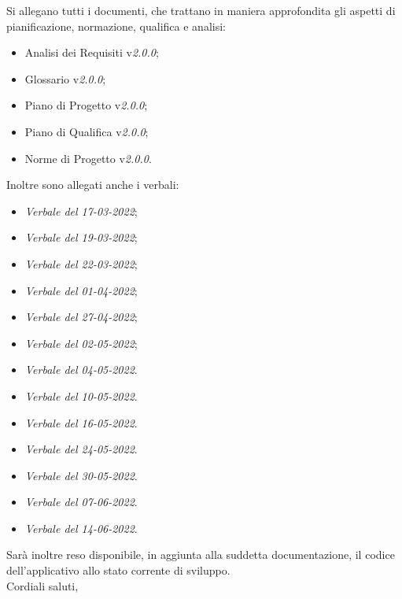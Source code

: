 \documentclass[a4paper, 12pt]{letter}
\begin{document}
\begin{letter}
        Si allegano tutti i documenti, che trattano in maniera approfondita gli aspetti di pianificazione, normazione, qualifica e analisi:
        \begin{itemize}
        	\item Analisi dei Requisiti v\textit{2.0.0};
            \item Glossario v\textit{2.0.0};
            \item Piano di Progetto v\textit{2.0.0};
            \item Piano di Qualifica v\textit{2.0.0};
            \item Norme di Progetto v\textit{2.0.0}.
        \end{itemize}
        Inoltre sono allegati anche i verbali:
        \begin{itemize}
            \item \textit{Verbale del 17-03-2022};
            \item \textit{Verbale del 19-03-2022};
            \item \textit{Verbale del 22-03-2022};
            \item \textit{Verbale del 01-04-2022};
            \item \textit{Verbale del 27-04-2022};
            \item \textit{Verbale del 02-05-2022};
            \item \textit{Verbale del 04-05-2022}.
            \item \textit{Verbale del 10-05-2022}.
            \item \textit{Verbale del 16-05-2022}.
            \item \textit{Verbale del 24-05-2022}.
            \item \textit{Verbale del 30-05-2022}.
            \item \textit{Verbale del 07-06-2022}.
            \item \textit{Verbale del 14-06-2022}.
        \end{itemize}
        Sarà inoltre reso disponibile, in aggiunta alla suddetta documentazione, il codice dell'applicativo allo stato corrente di sviluppo. \\
        Cordiali saluti,
        \begin{flushright}

\end{flushright}
\end{letter}
\end{document}
